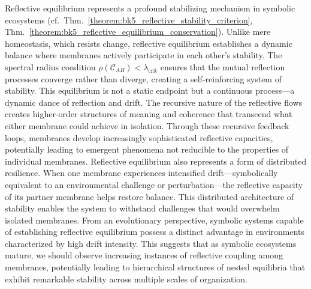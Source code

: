 \begin{scholium}
\label{scholium:bk5__distributed_resilience}
Reflective equilibrium represents a profound stabilizing mechanism in symbolic ecosystems (cf.~Thm.~\ref{theorem:bk5_reflective_stability_criterion}, Thm.~\ref{theorem:bk5_reflective_equilibrium_conservation}). Unlike mere homeostasis, which resists change, reflective equilibrium establishes a dynamic balance where membranes actively participate in each other's stability. The spectral radius condition $\rho(\mathcal{C}_{AB}) < \lambda_{\text{crit}}$ ensures that the mutual reflection processes converge rather than diverge, creating a self-reinforcing system of stability.
This equilibrium is not a static endpoint but a continuous process—a dynamic dance of reflection and drift. The recursive nature of the reflective flows creates higher-order structures of meaning and coherence that transcend what either membrane could achieve in isolation. Through these recursive feedback loops, membranes develop increasingly sophisticated reflective capacities, potentially leading to emergent phenomena not reducible to the properties of individual membranes.
Reflective equilibrium also represents a form of distributed resilience. When one membrane experiences intensified drift—symbolically equivalent to an environmental challenge or perturbation—the reflective capacity of its partner membrane helps restore balance. This distributed architecture of stability enables the system to withstand challenges that would overwhelm isolated membranes.
From an evolutionary perspective, symbolic systems capable of establishing reflective equilibrium possess a distinct advantage in environments characterized by high drift intensity. This suggests that as symbolic ecosystems mature, we should observe increasing instances of reflective coupling among membranes, potentially leading to hierarchical structures of nested equilibria that exhibit remarkable stability across multiple scales of organization.
\end{scholium}
